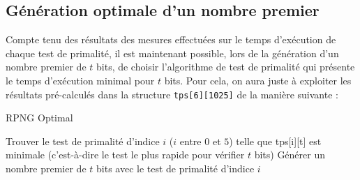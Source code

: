 		
	\subsection{Génération optimale d'un nombre premier}
		Compte tenu des résultats des mesures effectuées sur le temps d'exécution de chaque test de primalité, il est maintenant possible, lors de la génération d'un nombre premier de $t$ bits, de choisir l'algorithme de test de primalité qui présente le temps d'exécution minimal pour $t$ bits. Pour cela, on aura juste à exploiter les résultats pré-calculés dans la structure \lstinline!tps[6][1025]! de la manière suivante :\\
			
			\begin{algorithm}[H]
				\caption{RPNG Optimal}\label{RPNG_opt}
				Trouver le test de primalité d'indice $i$ ($i$ entre $0$ et $5$) telle que tps[i][t] est minimale (c'est-à-dire le test le plus rapide pour vérifier $t$ bits)\;
				Générer un nombre premier de $t$ bits avec le test de primalité d'indice $i$\;
			\end{algorithm}
			~\\
